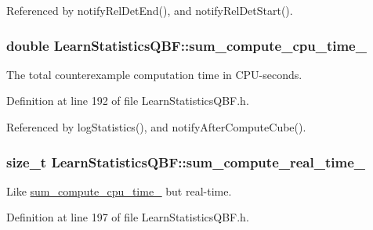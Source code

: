 Referenced by notify\-Rel\-Det\-End(), and notify\-Rel\-Det\-Start().

\hypertarget{classLearnStatisticsQBF_a4caf75f422eed77570e5592ce35c9bd0}{
\subsubsection[{sum\-\_\-compute\-\_\-cpu\-\_\-time\-\_\-}]{\setlength{\rightskip}{0pt plus 5cm}double Learn\-Statistics\-Q\-B\-F\-::sum\-\_\-compute\-\_\-cpu\-\_\-time\-\_\-\hspace{0.3cm}{\ttfamily [protected]}}}\label{classLearnStatisticsQBF_a4caf75f422eed77570e5592ce35c9bd0}


The total counterexample computation time in C\-P\-U-\/seconds. 



Definition at line 192 of file Learn\-Statistics\-Q\-B\-F.\-h.



Referenced by log\-Statistics(), and notify\-After\-Compute\-Cube().

\hypertarget{classLearnStatisticsQBF_aceb8e32bfd42839f2c19d3b12e7eb888}{
\subsubsection[{sum\-\_\-compute\-\_\-real\-\_\-time\-\_\-}]{\setlength{\rightskip}{0pt plus 5cm}size\-\_\-t Learn\-Statistics\-Q\-B\-F\-::sum\-\_\-compute\-\_\-real\-\_\-time\-\_\-\hspace{0.3cm}{\ttfamily [protected]}}}\label{classLearnStatisticsQBF_aceb8e32bfd42839f2c19d3b12e7eb888}


Like \hyperlink{classLearnStatisticsQBF_a4caf75f422eed77570e5592ce35c9bd0}{sum\-\_\-compute\-\_\-cpu\-\_\-time\-\_\-} but real-\/time. 



Definition at line 197 of file Learn\-Statistics\-Q\-B\-F.\-h.



